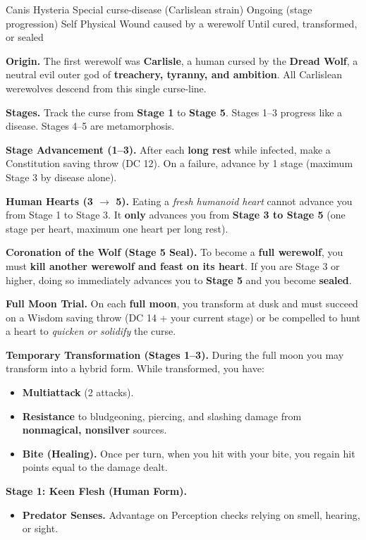 \DndSpellHeader%
  {Canis Hysteria}
  {Special curse-disease (Carlislean strain)}
  {Ongoing (stage progression)}
  {Self}
  {Physical Wound caused by a werewolf}
  {Until cured, transformed, or sealed}

\textbf{Origin.} The first werewolf was \textbf{Carlisle}, a human cursed by the \textbf{Dread Wolf}, a neutral evil outer god of \textbf{treachery, tyranny, and ambition}. All Carlislean werewolves descend from this single curse-line.

\textbf{Stages.} Track the curse from \textbf{Stage 1} to \textbf{Stage 5}. Stages 1--3 progress like a disease. Stages 4--5 are metamorphosis.

\textbf{Stage Advancement (1--3).} After each \textbf{long rest} while infected, make a Constitution saving throw (DC 12). On a failure, advance by 1 stage (maximum Stage 3 by disease alone).

\textbf{Human Hearts (3 $\rightarrow$ 5).} Eating a \emph{fresh humanoid heart} cannot advance you from Stage 1 to Stage 3. It \textbf{only} advances you from \textbf{Stage 3 to Stage 5} (one stage per heart, maximum one heart per long rest).

\textbf{Coronation of the Wolf (Stage 5 Seal).} To become a \textbf{full werewolf}, you must \textbf{kill another werewolf and feast on its heart}. If you are Stage 3 or higher, doing so immediately advances you to \textbf{Stage 5} and you become \textbf{sealed}.

\textbf{Full Moon Trial.} On each \textbf{full moon}, you transform at dusk and must succeed on a Wisdom saving throw (DC 14 + your current stage) or be compelled to hunt a heart to \emph{quicken or solidify} the curse. 

\textbf{Temporary Transformation (Stages 1--3).} During the full moon you may transform into a hybrid form. While transformed, you have:
\begin{itemize}
\item \textbf{Multiattack} (2 attacks).
\item \textbf{Resistance} to bludgeoning, piercing, and slashing damage from \textbf{nonmagical, nonsilver} sources.
\item \textbf{Bite (Healing).} Once per turn, when you hit with your bite, you regain hit points equal to the damage dealt.
\end{itemize}

\textbf{Stage 1: Keen Flesh (Human Form).}
\begin{itemize}
\item \textbf{Predator Senses.} Advantage on Perception checks relying on smell, hearing, or sight.
\end{itemize}

